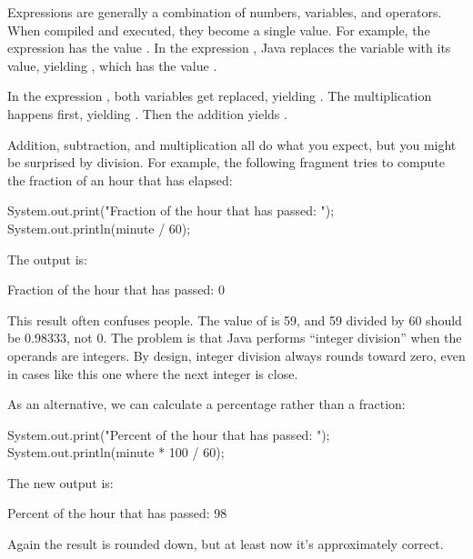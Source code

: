 Expressions are generally a combination of numbers, variables, and operators.
When compiled and executed, they become a single value.
For example, the expression  has the value .
In the expression , Java replaces the variable with its value, yielding , which has the value .

In the expression , both variables get replaced, yielding .
The multiplication happens first, yielding .
Then the addition yields .

Addition, subtraction, and multiplication all do what you expect, but you might be surprised by division.
For example, the following fragment tries to compute the fraction of an hour that has elapsed:%

\begin{code}
System.out.print("Fraction of the hour that has passed: ");
System.out.println(minute / 60);
\end{code}

The output is:

\begin{stdout}
Fraction of the hour that has passed: 0
\end{stdout}


This result often confuses people.
The value of  is 59, and 59 divided by 60 should be 0.98333, not 0.
The problem is that Java performs ``integer division'' when the operands are integers.
By design, integer division always rounds toward zero, even in cases like this one where the next integer is close.

As an alternative, we can calculate a percentage rather than a fraction:

\begin{code}
System.out.print("Percent of the hour that has passed: ");
System.out.println(minute * 100 / 60);
\end{code}

The new output is:

\begin{stdout}
Percent of the hour that has passed: 98
\end{stdout}

Again the result is rounded down, but at least now it's approximately correct.


